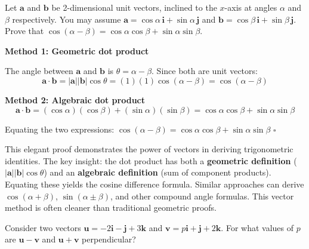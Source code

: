 \begin{problem}
Let $\mathbf{a}$ and $\mathbf{b}$ be 2-dimensional unit vectors, inclined to the $x$-axis at angles $\alpha$ and $\beta$ respectively. You may assume $\mathbf{a} = \cos\alpha\,\mathbf{i} + \sin\alpha\,\mathbf{j}$ and $\mathbf{b} = \cos\beta\,\mathbf{i} + \sin\beta\,\mathbf{j}$. Prove that $\cos(\alpha - \beta) = \cos\alpha\cos\beta + \sin\alpha\sin\beta$.
\end{problem}

\begin{solution}
\textbf{Method 1: Geometric dot product}

The angle between $\mathbf{a}$ and $\mathbf{b}$ is $\theta = \alpha - \beta$. Since both are unit vectors:
$$\mathbf{a} \cdot \mathbf{b} = |\mathbf{a}||\mathbf{b}|\cos\theta = (1)(1)\cos(\alpha - \beta) = \cos(\alpha - \beta)$$
\vspace{-2mm}

\textbf{Method 2: Algebraic dot product}
\vspace{-2mm}
$$\mathbf{a} \cdot \mathbf{b} = (\cos\alpha)(\cos\beta) + (\sin\alpha)(\sin\beta) = \cos\alpha\cos\beta + \sin\alpha\sin\beta$$
\vspace{-2mm}

Equating the two expressions: $\cos(\alpha - \beta) = \cos\alpha\cos\beta + \sin\alpha\sin\beta$ \quad $\square$
\end{solution}

\begin{takeaways}
This elegant proof demonstrates the power of vectors in deriving trigonometric identities. The key insight: the dot product has both a \textbf{geometric definition} ($|\mathbf{a}||\mathbf{b}|\cos\theta$) and an \textbf{algebraic definition} (sum of component products). Equating these yields the cosine difference formula. Similar approaches can derive $\cos(\alpha + \beta)$, $\sin(\alpha \pm \beta)$, and other compound angle formulas. This vector method is often cleaner than traditional geometric proofs.
\end{takeaways}

\vspace{1em}

\begin{problem}
Consider two vectors $\mathbf{u} = -2\mathbf{i} - \mathbf{j} + 3\mathbf{k}$ and $\mathbf{v} = p\mathbf{i} + \mathbf{j} + 2\mathbf{k}$. For what values of $p$ are $\mathbf{u} - \mathbf{v}$ and $\mathbf{u} + \mathbf{v}$ perpendicular?
\end{problem}


